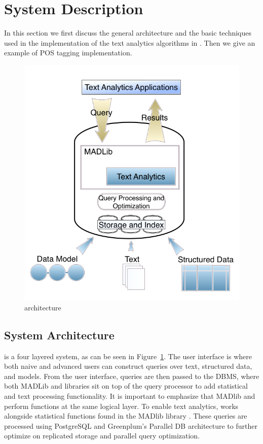 
\section{System Description}

In this section we first discuss the general architecture and the
basic techniques used in the implementation of the text analytics algorithms in {\system}.
Then we give an example of POS tagging implementation.

\begin{figure}
   \begin{center}
        \includegraphics[scale=0.2]{content/graphics/arch.png}
        \caption{{\system} architecture}
        \label{fig:arch}
   \end{center}
\end{figure}
    
\subsection{System Architecture}

{\system} is a four layered system, as can be seen in Figure~\ref{fig:arch}.
The user interface is where both naive and advanced users can construct queries over
text, structured data, and models. From the user interface, queries are then passed to the
DBMS, where both MADLib and {\system} libraries sit on top of the query processor to
add statistical and text processing functionality. 
It is important to emphasize that MADlib and {\system} perform functions
at the same logical layer.  
To enable text analytics, {\system} works alongside statistical
functions found in the MADlib library \cite{hellerstein2012madlib}.
These queries are processed using 
PostgreSQL and Greenplum's Parallel DB architecture to further optimize on 
replicated storage and parallel query optimization. 


